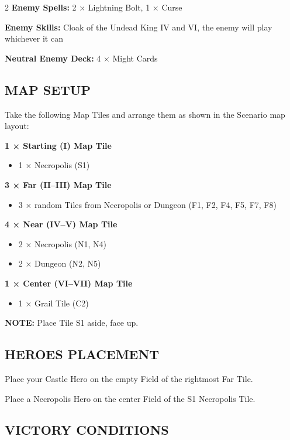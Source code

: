 \begin{multicols}{2}
\textbf{Enemy Spells:} 2 × Lightning Bolt, 1 × Curse

\textbf{Enemy Skills:} Cloak of the Undead King IV and VI, the enemy will play whichever it can

\textbf{Neutral Enemy Deck:} 4 × Might Cards

\subsection*{\MakeUppercase{Map setup}}

Take the following Map Tiles and arrange them as shown in the Scenario map layout:

\textbf{1 × Starting (I) Map Tile}
\begin{itemize}
    \item 1 × Necropolis (S1)
\end{itemize}

\textbf{3 × Far (II--III) Map Tile}
\begin{itemize}
    \item 3 × random Tiles from Necropolis or Dungeon (F1, F2, F4, F5, F7, F8)
\end{itemize}

\textbf{4 × Near (IV--V) Map Tile}
\begin{itemize}
    \item 2 × Necropolis (N1, N4)
    \item 2 × Dungeon (N2, N5)
\end{itemize}

\textbf{1 × Center (VI--VII) Map Tile}
\begin{itemize}
  \item 1 × Grail Tile (C2)
\end{itemize}

\textbf{\MakeUppercase{Note:}} Place Tile S1 aside, face up.

\subsection*{\MakeUppercase{Heroes placement}}

Place your Castle Hero on the empty Field of the rightmost Far Tile.

Place a Necropolis Hero on the center Field of the S1 Necropolis Tile.

\subsection*{\MakeUppercase{Victory Conditions}}


\end{multicols}
